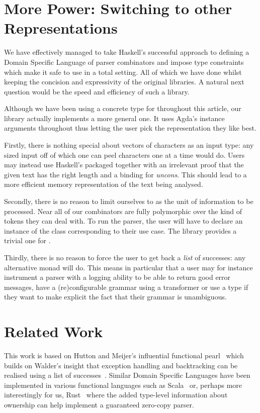 \section{More Power: Switching to other Representations}

We have effectively managed to take Haskell's successful approach to defining
a Domain Specific Language of parser combinators and impose type constraints
which make it safe to use in a total setting. All of which we have done whilst
keeping the concision and expressivity of the original libraries. A natural
next question would be the speed and efficiency of such a library.

Although we have been using a concrete type for  throughout
this article, our library actually implements a more general one. It uses
Agda's instance arguments throughout thus letting the user pick the
representation they like best.

Firstly, there is nothing special about vectors of characters as an input
type: any sized input off of which one can peel characters one at a time
would do. Users may instead use Haskell's  packaged together
with an irrelevant proof that the given text has the right length and a
binding for \textit{uncons}. This should lead to a more efficient memory
representation of the text being analysed.

Secondly, there is no reason to limit ourselves to  as the
unit of information to be processed. Near all of our combinators are
fully polymorphic over the kind of tokens they can deal with. To run
the parser, the user will have to declare an instance of the 
class corresponding to their use case. The library provides a trivial
one for .

Thirdly, there is no reason to force the user to get back a \emph{list}
of successes: any alternative monad will do. This means in particular that
a user may for instance instrument a parser with a logging ability to be
able to return good error messages, have a (re)configurable grammar using
a  transformer or use a  type if they want to make
explicit the fact that their grammar is unambiguous.

\section{Related Work}

This work is based on Hutton and Meijer's influential functional pearl~\citeyear{hutton1998monadic}
which builds on Walder's insight that exception handling and backtracking can be
realised using a list of successes~\citeyear{wadler1985replace}. Similar Domain
Specific Languages have been implemented in various functional languages such as
Scala~\cite{moors2008parser} or, perhaps more interestingly for us, Rust~\cite{couprie2015nom}
where the added type-level information about ownership can help implement a
guaranteed zero-copy parser.


